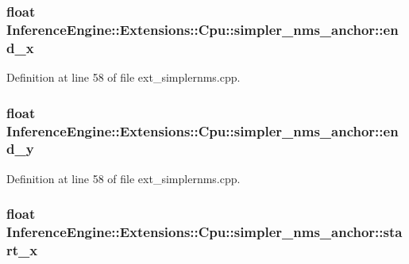 \subsubsection[{\texorpdfstring{end\+\_\+x}{end_x}}]{\setlength{\rightskip}{0pt plus 5cm}float Inference\+Engine\+::\+Extensions\+::\+Cpu\+::simpler\+\_\+nms\+\_\+anchor\+::end\+\_\+x}\hypertarget{structInferenceEngine_1_1Extensions_1_1Cpu_1_1simpler__nms__anchor_af07a5993a79b25f3e3156aae639942d0}{}\label{structInferenceEngine_1_1Extensions_1_1Cpu_1_1simpler__nms__anchor_af07a5993a79b25f3e3156aae639942d0}


Definition at line 58 of file ext\+\_\+simplernms.\+cpp.

\subsubsection[{\texorpdfstring{end\+\_\+y}{end_y}}]{\setlength{\rightskip}{0pt plus 5cm}float Inference\+Engine\+::\+Extensions\+::\+Cpu\+::simpler\+\_\+nms\+\_\+anchor\+::end\+\_\+y}\hypertarget{structInferenceEngine_1_1Extensions_1_1Cpu_1_1simpler__nms__anchor_a42e7a3fd477d78aee09a64a973954d48}{}\label{structInferenceEngine_1_1Extensions_1_1Cpu_1_1simpler__nms__anchor_a42e7a3fd477d78aee09a64a973954d48}


Definition at line 58 of file ext\+\_\+simplernms.\+cpp.

\subsubsection[{\texorpdfstring{start\+\_\+x}{start_x}}]{\setlength{\rightskip}{0pt plus 5cm}float Inference\+Engine\+::\+Extensions\+::\+Cpu\+::simpler\+\_\+nms\+\_\+anchor\+::start\+\_\+x}\hypertarget{structInferenceEngine_1_1Extensions_1_1Cpu_1_1simpler__nms__anchor_a115e61c41a6ad4d41470119edeca3829}{}\label{structInferenceEngine_1_1Extensions_1_1Cpu_1_1simpler__nms__anchor_a115e61c41a6ad4d41470119edeca3829}


